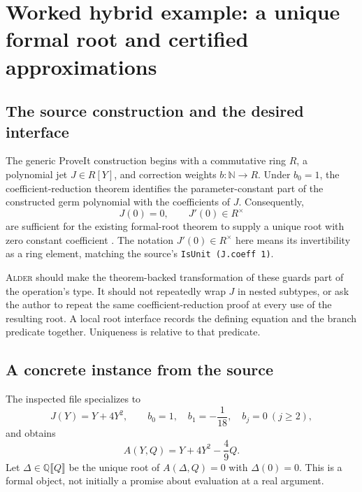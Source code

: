 \documentclass[11pt,a4paper]{article}
\newcommand{\code}[1]{\nolinkurl{#1}}
\newcommand{\Alder}{\textsc{Alder}}
\newcommand{\N}{\mathbb N}\newcommand{\Z}{\mathbb Z}\newcommand{\Q}{\mathbb Q}\newcommand{\R}{\mathbb R}
\theoremstyle{plain}
\theoremstyle{definition}
\theoremstyle{remark}
\begin{document}
\section{Worked hybrid example: a unique formal root and certified approximations}\label{sec:germ}

\subsection{The source construction and the desired interface}
The generic ProveIt construction begins with a commutative ring $R$, a polynomial jet $J\in R[Y]$, and correction weights $b:\N\to R$. Under $b_0=1$, the coefficient-reduction theorem identifies the parameter-constant part of the constructed germ polynomial with the coefficients of $J$. Consequently,
\[
 J(0)=0,\qquad J'(0)\in R^\times
\]
are sufficient for the existing formal-root theorem to supply a unique root with zero constant coefficient \cite{germ}. The notation $J'(0)\in R^\times$ here means its invertibility as a ring element, matching the source's \code{IsUnit (J.coeff 1)}.

\Alder{} should make the theorem-backed transformation of these guards part of the operation's type. It should not repeatedly wrap $J$ in nested subtypes, or ask the author to repeat the same coefficient-reduction proof at every use of the resulting root. A local root interface records the defining equation and the branch predicate together. Uniqueness is relative to that predicate.

\subsection{A concrete instance from the source}
The inspected file specializes to
\[
 J(Y)=Y+4Y^2,\qquad b_0=1,\quad b_1=-\frac1{18},\quad b_j=0\ (j\ge2),
\]
and obtains
\begin{equation}\label{eq:germpoly}
 A(Y,Q)=Y+4Y^2-\frac49Q.
\end{equation}
Let $\Delta\in\Q\llbracket Q\rrbracket$ be the unique root of $A(\Delta,Q)=0$ with $\Delta(0)=0$. This is a formal object, not initially a promise about evaluation at a real argument.
\end{document}
